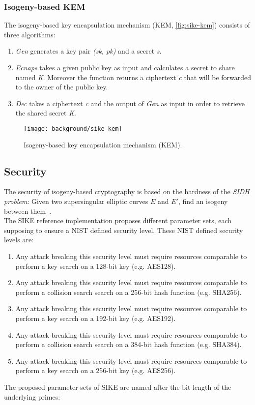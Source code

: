 \subsubsection{Isogeny-based KEM}
The isogeny-based key encapsulation mechanism (KEM, \autoref{fig:sike-kem}) consists of three algorithms:
\begin{enumerate}
\item \textit{Gen} generates a key pair \textit{(sk, pk)} and a secret \textit{s}.
\item \textit{Ecnaps} takes a given public key as input and calculates a secret to share named \textit{K}. Moreover the function returns a ciphertext \textit{c} that will be forwarded to the owner of the public key.
\item \textit{Dec} takes a ciphertext \textit{c} and the output of \textit{Gen} as input in order to retrieve the shared secret \textit{K}.
\end{enumerate}
\begin{figure}[H]
  \centering
  \texttt{[image: background/sike\_kem]}
  \caption[Isogeny-based KEM]
  {Isogeny-based key encapsulation mechanism (KEM).} \label{fig:sike-kem}
\end{figure}

\subsection{Security}\label{sidh_security}
The security of isogeny-based cryptography is based on the hardness of the \textit{SIDH problem}: Given two supersingular elliptic curves $E$ and $E'$, find an isogeny between them~\parencite{sike2020spec}. 
\\
The SIKE reference implementation proposes different parameter sets, each supposing to ensure a NIST defined security level. These NIST defined security levels are:
\begin{enumerate}
\itemsep0em 
	\item Any attack breaking this security level must require resources comparable to perform a key search on a 128-bit key (e.g. AES128).
	\item Any attack breaking this security level must require resources comparable to perform a collision search search on a 256-bit hash function (e.g. SHA256).
	\item Any attack breaking this security level must require resources comparable to perform a key search on a 192-bit key (e.g. AES192).
	\item Any attack breaking this security level must require resources comparable to perform a collision search search on a 384-bit hash function (e.g. SHA384).
	\item Any attack breaking this security level must require resources comparable to perform a key search on a 256-bit key (e.g. AES256).
\end{enumerate}
The proposed parameter sets of SIKE are named after the bit length of the underlying primes:

